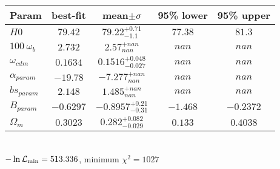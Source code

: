 \begin{tabular}{|l|c|c|c|c|} 
 \hline 
Param & best-fit & mean$\pm\sigma$ & 95\% lower & 95\% upper \\ \hline 
$H0$ &$79.42$ & $79.22_{-1.1}^{+0.71}$ & $77.38$ & $81.3$ \\ 
$100~\omega_{b }$ &$2.732$ & $2.57_{nan}^{+nan}$ & $nan$ & $nan$ \\ 
$\omega_{cdm }$ &$0.1634$ & $0.1516_{-0.027}^{+0.048}$ & $nan$ & $nan$ \\ 
$\alpha_{param }$ &$-19.78$ & $-7.277_{nan}^{+nan}$ & $nan$ & $nan$ \\ 
$bs_{param }$ &$2.148$ & $1.485_{nan}^{+nan}$ & $nan$ & $nan$ \\ 
$B_{param }$ &$-0.6297$ & $-0.8957_{-0.31}^{+0.21}$ & $-1.468$ & $-0.2372$ \\ 
$\Omega_{m }$ &$0.3023$ & $0.282_{-0.029}^{+0.082}$ & $0.133$ & $0.4038$ \\ 
\hline 
 \end{tabular} \\ 
$-\ln{\cal L}_\mathrm{min} =513.336$, minimum $\chi^2=1027$ \\ 
